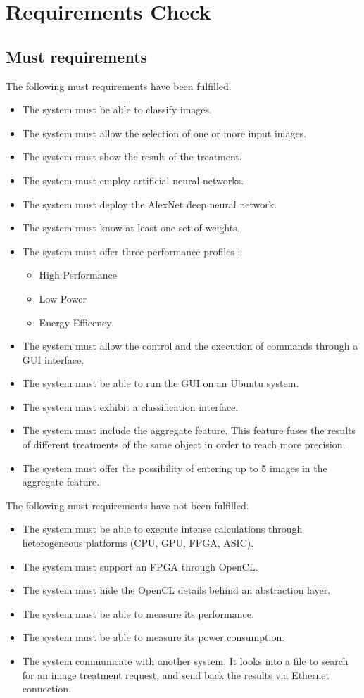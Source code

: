 \documentclass[parskip=full]{scrartcl}
\begin{document}
\pagebreak

\section {Requirements Check}
\subsection {Must requirements}
The following must requirements have been fulfilled.
\begin{itemize}
	\item The system must be able to classify images.
	\item The system must allow the selection of one or more input images.
	\item The system must show the result of the treatment.
	\item The system must employ artificial neural networks.
	\item The system must deploy the AlexNet deep neural network.
	\item The system must know at least one set of weights.
	\item The system must offer three performance profiles : 
	\begin{itemize}
		\item High Performance
		\item Low Power
		\item Energy Efficency
	\end{itemize}
	\item The system must allow the control and the execution of commands through a GUI interface.
	\item The system must be able to run the GUI on an Ubuntu system.
	\item The system must exhibit a classification interface.
	\item The system must include the aggregate feature. This feature fuses the results of different treatments of the same object in order to reach more precision.
	\item The system must offer the possibility of entering up to 5 images in the aggregate feature.
\end{itemize}
\pagebreak

The following must requirements have not been fulfilled.
\begin{itemize}
	\item The system must be able to execute intense calculations through heterogeneous platforms (CPU, GPU, FPGA, ASIC).
	\item The system must support an FPGA through OpenCL.
	\item The system must hide the OpenCL details behind an abstraction layer.
	\item The system must be able to measure its performance.
	\item The system must be able to measure its power consumption.
	\item The system communicate with another system. It looks into a file to search for an image treatment request, and send back the results via Ethernet connection.
\end{itemize}
\end{document}
